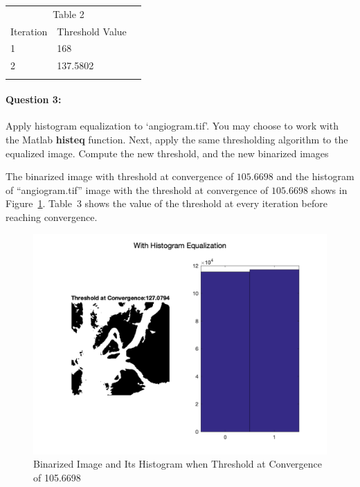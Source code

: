 \documentclass[12pt, letter]{article}
\begin{document}
\begin{center}
\begin{tabular}{llr}  
\toprule
\multicolumn{2}{c}{Table 2} \\
\cmidrule(r){1-2}
Iteration   & Threshold Value \\
\midrule
1      & 168 \\
2 & 137.5802 \\

\bottomrule
\label{table:q2-2}
\end{tabular}    
\end{center}

\paragraph{Question 3:} Apply histogram equalization to ‘angiogram.tif’. You may choose to work with the Matlab \textbf{histeq} function. Next, apply the same thresholding algorithm to the equalized image. Compute the new threshold, and the new binarized images

The binarized image with threshold at convergence of $\mathbf{105.6698}$ and the histogram of ``angiogram.tif'' image with the threshold at convergence of $\mathbf{105.6698}$ shows in Figure~\ref{fig:q3-1}. Table~3 shows the value of the threshold at every iteration before reaching convergence.

\begin{figure}
    \centering
    \includegraphics[width=14cm]{q3-1.png}
    \caption{Binarized Image and Its Histogram when Threshold at Convergence of 105.6698}
    \label{fig:q3-1}
\end{figure}
\end{document}
